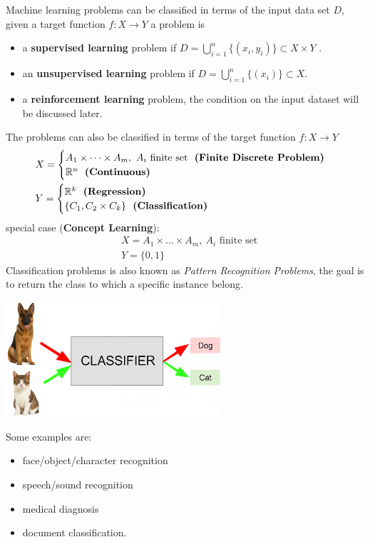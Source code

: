 \documentclass[10pt, letterpaper]{report}
\begin{document}
Machine learning problems can be classified in terms of the input data set $D$, given a target function $f:X\rightarrow Y$ a problem is\begin{itemize}
	\item a \textbf{supervised learning} problem if $D=\bigcup_{i=1}^n\{(x_i,y_i)\}\subset X\times Y$ .
	\item an \textbf{unsupervised learning} problem if $D=\bigcup_{i=1}^n\{(x_i)\}\subset X$.
	\item a \textbf{reinforcement learning} problem, the condition on the input dataset will be discussed later.
\end{itemize}
The problems can also be classified in terms of the target function $f:X\rightarrow Y$
\begin{align*}
	 & X=\begin{cases}
		     A_1\times \dots \times A_m, \ A_i \text{ finite set} \ \ \textbf{(Finite Discrete Problem)} \\
		     \R^n \ \ \textbf{(Continuous)}
	     \end{cases} \\
	 & Y=\begin{cases}
		     \R^k \ \ \textbf{(Regression)} \\
		     \{C_1,C_2\times C_k\} \ \ \textbf{(Classification)}
	     \end{cases}
\end{align*}
special case (\textbf{Concept Learning}):\begin{align*}
	 & X = A_1\times \dots \times A_m, \ A_i \text{ finite set} \\
	 & Y = \{0,1\}
\end{align*}
Classification problems is also known as \textit{Pattern Recognition Problems}, the goal is to return the class to which a specific instance belong.\begin{center}
	\includegraphics[width=0.6\textwidth]{images/classifier.png}
\end{center}
Some examples are:\begin{itemize}
	\item face/object/character recognition
	\item speech/sound recognition
	\item medical diagnosis
	\item document classification.
\end{itemize}
\end{document}
